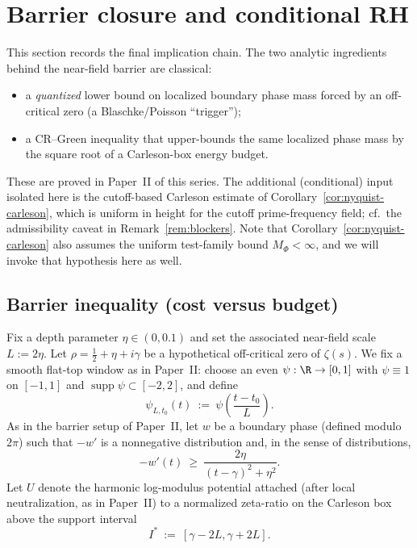 \documentclass[11pt]{article}
\begin{document}
\section{Barrier closure and conditional RH}\label{sec:closure}

This section records the final implication chain.
The two analytic ingredients behind the near-field barrier are classical:
\begin{itemize}
\item a \emph{quantized} lower bound on localized boundary phase mass forced by an off-critical zero (a Blaschke/Poisson ``trigger'');
\item a CR--Green inequality that upper-bounds the same localized phase mass by the square root of a Carleson-box energy budget.
\end{itemize}
These are proved in Paper~II of this series.
The additional (conditional) input isolated here is the cutoff-based Carleson estimate of Corollary~\ref{cor:nyquist-carleson}, which is uniform in height for the cutoff prime-frequency field; cf.\ the admissibility caveat in Remark~\ref{rem:blockers}.
Note that Corollary~\ref{cor:nyquist-carleson} also assumes the uniform test-family bound $M_\Phi<\infty$, and we will invoke that hypothesis here as well.

\subsection*{Barrier inequality (cost versus budget)}
Fix a depth parameter $\eta\in(0,0.1)$ and set the associated near-field scale $L:=2\eta$.
Let $\rho=\tfrac12+\eta+i\gamma$ be a hypothetical off-critical zero of $\zeta(s)$.
We fix a smooth flat-top window as in Paper~II: choose an even $\psi:\R\to[0,1]$ with $\psi\equiv 1$ on $[-1,1]$ and $\operatorname{supp}\psi\subset[-2,2]$, and define
\[
  \psi_{L,t_0}(t)\ :=\ \psi\!\left(\frac{t-t_0}{L}\right).
\]
As in the barrier setup of Paper~II, let $w$ be a boundary phase (defined modulo $2\pi$) such that $-w'$ is a nonnegative distribution and, in the sense of distributions,
\[
  -w'(t)\ \ge\ \frac{2\eta}{(t-\gamma)^2+\eta^2}.
\]
Let $U$ denote the harmonic log-modulus potential attached (after local neutralization, as in Paper~II) to a normalized zeta-ratio on the Carleson box above the support interval
\[
  I^\ast\ :=\ [\gamma-2L,\gamma+2L].
\]
\end{document}

